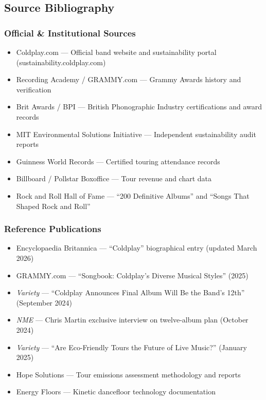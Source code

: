 \documentclass[11pt,letterpaper]{article}
\begin{document}
\subsection{Source Bibliography}

\subsubsection{Official \& Institutional Sources}
\begin{itemize}[leftmargin=2em]
  \item Coldplay.com --- Official band website and sustainability portal (sustainability.coldplay.com)
  \item Recording Academy / GRAMMY.com --- Grammy Awards history and verification
  \item Brit Awards / BPI --- British Phonographic Industry certifications and award records
  \item MIT Environmental Solutions Initiative --- Independent sustainability audit reports
  \item Guinness World Records --- Certified touring attendance records
  \item Billboard / Pollstar Boxoffice --- Tour revenue and chart data
  \item Rock and Roll Hall of Fame --- ``200 Definitive Albums'' and ``Songs That Shaped Rock and Roll''
\end{itemize}

\subsubsection{Reference Publications}
\begin{itemize}[leftmargin=2em]
  \item Encyclopaedia Britannica --- ``Coldplay'' biographical entry (updated March 2026)
  \item GRAMMY.com --- ``Songbook: Coldplay's Diverse Musical Styles'' (2025)
  \item \textit{Variety} --- ``Coldplay Announces Final Album Will Be the Band's 12th'' (September 2024)
  \item \textit{NME} --- Chris Martin exclusive interview on twelve-album plan (October 2024)
  \item \textit{Variety} --- ``Are Eco-Friendly Tours the Future of Live Music?'' (January 2025)
  \item Hope Solutions --- Tour emissions assessment methodology and reports
  \item Energy Floors --- Kinetic dancefloor technology documentation
\end{itemize}
\end{document}
